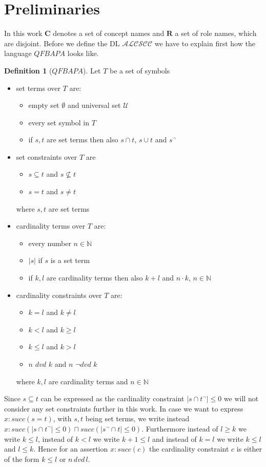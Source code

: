 \documentclass[a4paper,11pt]{scrartcl}
\theoremstyle{break}
\theoremstyle{definition}
\newtheorem{mydef}{Definition}
\begin{document}
\section{Preliminaries}
In this work $\mathbf{C}$ denotes a set of concept names and $\mathbf{R}$ a set of role names, which are disjoint. Before we define the DL $\mathcal{ALCSCC}$ we have to explain first how the language $QFBAPA$ looks like.
\begin{mydef}[$QFBAPA$]
Let $T$ be a set of symbols
\begin{itemize}
\item set terms over $T$ are:
\begin{itemize}
\item empty set $\emptyset$ and universal set $
\mathcal{U}$
\item every set symbol in $T$
\item if $s,t$ are set terms then also $s\cap t$, $s\cup t$ and $s^{\neg}$
\end{itemize}
\item set constraints over $T$ are
\begin{itemize}
\item $s\subseteq t$ and $s\not\subseteq t$
\item $s=t$ and $s\neq t$
\end{itemize}
where $s,t$ are set terms
\item cardinality terms over $T$ are:
\begin{itemize}
\item every number $n\in \mathbb{N}$
\item $|s|$ if $s$ is a set term
\item if $k,l$ are cardinality terms then also $k+l$ and $n\cdot k$, $n\in \mathbb{N}$
\end{itemize}
\item cardinality constraints over $T$ are:
\begin{itemize}
\item $k=l$ and $k\neq l$
\item $k<l$ and $k\geq l$
\item $k\leq l$ and $k>l$
\item $n$ $dvd$ $k$ and $n$ $\neg dvd$ $k$
\end{itemize}
where $k,l$ are cardinality terms and $n\in\mathbb{N}$
\end{itemize}
\end{mydef}
Since $s\subseteq t$ can be expressed as the cardinality constraint $|s\cap t^\neg|\leq 0$ we will not consider any set constraints further in this work. In case we want to express $x:succ(s=t)$, with $s,t$ being set terms, we write instead $x:succ(|s\cap t^\neg|\leq 0)\sqcap succ(|s^\neg\cap t|\leq 0)$. Furthermore instead of $l\geq k$ we write $k\leq l$, instead of $k<l$ we write $k+1\leq l$ and instead of $k=l$ we write $k\leq l$ and $l\leq k$. Hence for an assertion $x:succ(c)$ the cardinality constraint $c$ is either of the form $k\leq l$ or $n\,dvd\,l$.
\end{document}
